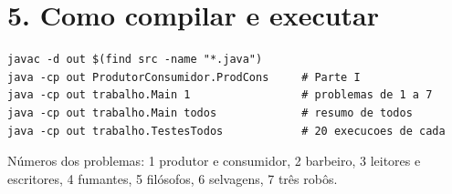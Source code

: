 \documentclass[12pt,a4paper]{article}
\begin{document}
\section*{5. Como compilar e executar}
\begin{Verbatim}[frame=single]
javac -d out $(find src -name "*.java")
java -cp out ProdutorConsumidor.ProdCons     # Parte I
java -cp out trabalho.Main 1                 # problemas de 1 a 7
java -cp out trabalho.Main todos             # resumo de todos
java -cp out trabalho.TestesTodos            # 20 execucoes de cada
\end{Verbatim}
Números dos problemas: 1 produtor e consumidor, 2 barbeiro, 3 leitores e escritores, 4 fumantes, 5 filósofos,
6 selvagens, 7 três robôs.
\end{document}

